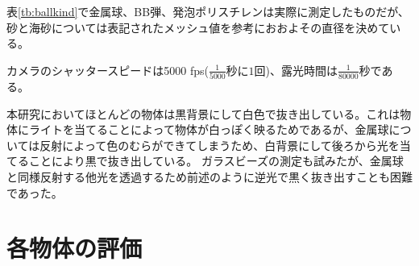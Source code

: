 \documentclass[a4paper,10pt,twocolumn,dvipdfmx]{jsarticle}
\begin{document}
表\ref{tb:ballkind}で金属球、BB弾、発泡ポリスチレンは実際に測定したものだが、砂と海砂については表記されたメッシュ値を参考におおよその直径を決めている。 \par
カメラのシャッタースピードは5000 fps($\frac{1}{5000}秒に1回$)、露光時間は$\frac{1}{80000}秒$である。 \par
本研究においてほとんどの物体は黒背景にして白色で抜き出している。これは物体にライトを当てることによって物体が白っぽく映るためであるが、金属球については反射によって色のむらができてしまうため、白背景にして後ろから光を当てることにより黒で抜き出している。
ガラスビーズの測定も試みたが、金属球と同様反射する他光を透過するため前述のように逆光で黒く抜き出すことも困難であった。

\section{各物体の評価}
\end{document}
